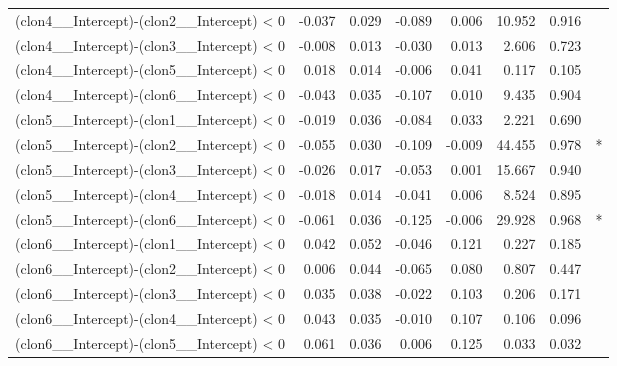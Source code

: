 \begin{table}[ht]
\begin{tabular}{lrrrrrrl}
  (clon4__Intercept)-(clon2__Intercept) < 0 & -0.037 & 0.029 & -0.089 & 0.006 & 10.952 & 0.916 &  \\ 
  (clon4__Intercept)-(clon3__Intercept) < 0 & -0.008 & 0.013 & -0.030 & 0.013 & 2.606 & 0.723 &  \\ 
  (clon4__Intercept)-(clon5__Intercept) < 0 & 0.018 & 0.014 & -0.006 & 0.041 & 0.117 & 0.105 &  \\ 
  (clon4__Intercept)-(clon6__Intercept) < 0 & -0.043 & 0.035 & -0.107 & 0.010 & 9.435 & 0.904 &  \\ 
  (clon5__Intercept)-(clon1__Intercept) < 0 & -0.019 & 0.036 & -0.084 & 0.033 & 2.221 & 0.690 &  \\ 
  (clon5__Intercept)-(clon2__Intercept) < 0 & -0.055 & 0.030 & -0.109 & -0.009 & 44.455 & 0.978 & * \\ 
  (clon5__Intercept)-(clon3__Intercept) < 0 & -0.026 & 0.017 & -0.053 & 0.001 & 15.667 & 0.940 &  \\ 
  (clon5__Intercept)-(clon4__Intercept) < 0 & -0.018 & 0.014 & -0.041 & 0.006 & 8.524 & 0.895 &  \\ 
  (clon5__Intercept)-(clon6__Intercept) < 0 & -0.061 & 0.036 & -0.125 & -0.006 & 29.928 & 0.968 & * \\ 
  (clon6__Intercept)-(clon1__Intercept) < 0 & 0.042 & 0.052 & -0.046 & 0.121 & 0.227 & 0.185 &  \\ 
  (clon6__Intercept)-(clon2__Intercept) < 0 & 0.006 & 0.044 & -0.065 & 0.080 & 0.807 & 0.447 &  \\ 
  (clon6__Intercept)-(clon3__Intercept) < 0 & 0.035 & 0.038 & -0.022 & 0.103 & 0.206 & 0.171 &  \\ 
  (clon6__Intercept)-(clon4__Intercept) < 0 & 0.043 & 0.035 & -0.010 & 0.107 & 0.106 & 0.096 &  \\ 
  (clon6__Intercept)-(clon5__Intercept) < 0 & 0.061 & 0.036 & 0.006 & 0.125 & 0.033 & 0.032 &  \\ 
   \hline
\end{tabular}
\end{table}
